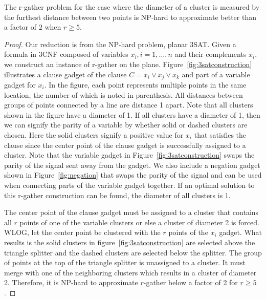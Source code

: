 \documentclass[11pt]{article}
\begin{document}
\begin{theorem}\label{thm:hardness1}
The r-gather problem for the case where the diameter of a cluster is measured by the furthest distance between two points is NP-hard to approximate better than a factor of $2$ when $r\geq5$.
\end{theorem}
\begin{proof}
Our reduction is from the NP-hard problem, planar 3SAT.  Given a formula in 3CNF composed of variables $x_i, i = 1,\dots,n$ and their complements $\overline{x_i}$, we construct an instance of r-gather on the plane.  Figure~\ref{fig:3satconstruction} illustrates a clause gadget of the clause $C = x_i \vee x_j \vee x_k$ and part of a variable gadget for $x_i$.  In the figure, each point represents multiple points in the same location, the number of which is noted in parenthesis.  All distances between groups of points connected by a line are distance 1 apart.  Note that all clusters shown in the figure have a diameter of 1.  If all clusters have a diameter of 1, then we can signify the parity of a variable by whether solid or dashed clusters are chosen.  Here the solid clusters signify a positive value for $x_i$ that satisfies the clause since the center point of the clause gadget is successfully assigned to a cluster.  Note that the variable gadget in Figure~\ref{fig:3satconstruction} swaps the parity of the signal sent away from the gadget.  We also include a negation gadget shown in Figure~\ref{fig:negation} that swaps the parity of the signal and can be used when connecting parts of the variable gadget together.  If an optimal solution to this r-gather construction can be found, the diameter of all clusters is 1.


The center point of the clause gadget must be assigned to a cluster that contains all $r$ points of one of the variable clusters or else a cluster of diameter 2 is forced.  WLOG, let the center point be clustered with the $r$ points of the $x_i$ gadget.  What results is the solid clusters in figure~\ref{fig:3satconstruction} are selected above the triangle splitter and the dashed clusters are selected below the splitter.  The group of points at the top of the triangle splitter is unassigned to a cluster.  It must merge with one of the neighboring clusters which results in a cluster of diameter 2.  Therefore, it is NP-hard to approximate $r$-gather below a factor of 2 for $r\geq5$.
\end{proof}
\end{document}
